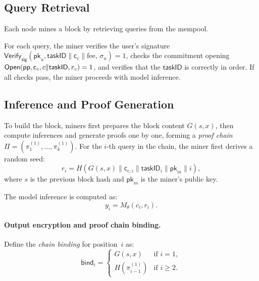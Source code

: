 \subsection{Query Retrieval}

Each node mines a block by retrieving queries from the mempool.

For each query, the miner verifies the user's signature \\$\mathsf{Verify}_{\mathsf{sig}}(\mathsf{pk}_u, \mathsf{taskID} \parallel \mathsf{c}_c \parallel \text{fee},\, \sigma_u) = 1$, checks the commitment opening $\mathsf{Open}(\mathsf{pp}, \mathsf{c}_c, c \| \mathsf{taskID}, r_c) = 1$, and verifies that the $\mathsf{taskID}$ is correctly in order. If all checks pass, the miner proceeds with model inference.

\subsection{Inference and Proof Generation}

To build the block, miners first prepares the block content $G(s,x)$, then compute inferences and generate proofs one by one, forming a \textit{proof chain} $\Pi = (\pi_1^{(1)}, \ldots, \pi_k^{(1)})$. For the $i$-th query in the chain, the miner first derives a random seed:
\begin{equation}
r_i = H(G(s,x) \parallel \mathsf{c}_{c,i} \parallel \mathsf{taskID}_i \parallel \mathsf{pk}_m \parallel i),
\end{equation}
where $s$ is the previous block hash and $\mathsf{pk}_m$ is the miner's public key.

The model inference is computed as:
\begin{equation}
y_i = M_\theta(c_i, r_i).
\end{equation}

\paragraph{Output encryption and proof chain binding.}
Define the \emph{chain binding} for position~$i$ as:
\[
\mathsf{bind}_i = 
\begin{cases}
G(s,x) & \text{if } i = 1, \\
H(\pi_{i-1}^{(1)}) & \text{if } i \geq 2.
\end{cases}
\]

